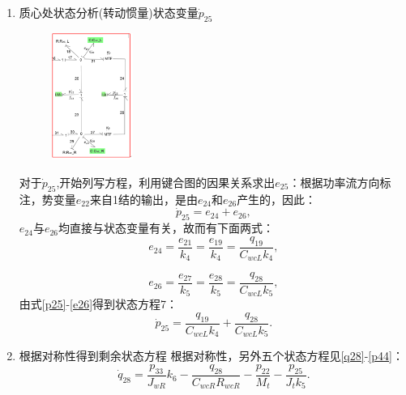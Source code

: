 \begin{enumerate}
\item {质心处状态分析(转动惯量)状态变量$\dot{ p}_{25} $}
\begin{figure}[H]
	\centering
	\includegraphics[width=0.25\textwidth]{fig/equation6.png}
	\caption{}\label{fig:equation6}
\end{figure}
对于$\dot{p} _ { 25 }$,开始列写方程，利用键合图的因果关系求出$e_{25}$：根据功率流方向标注，势变量$e_{22}$来自1结的输出，是由$e_{24}$和$e_{26}$产生的，因此：
\begin{equation}\label{p25}
\dot{ p } _ { 25 } = e _ { 24 } + e _ { 26 },
\end{equation}
$e_{24}$与$e_{26}$均直接与状态变量有关，故而有下面两式：
\begin{equation}
e _ { 24 } = \frac { e _ { 21 } } { k _ { 4 } } = \frac { e _ { 19 } } { k _ { 4 } } = \frac { q _ { 19 } } { C _ { w cL}  k _ { 4 } },
\end{equation}

\begin{equation}\label{e26}
e _ { 26 } = \frac { e _ { 27 } } { k _ { 5 } } = \frac { e _ { 28 } } { k _ { 5 } } = \frac { q _ { 28 } } { C _ { w c L }  k _ { 5 } },
\end{equation}
由式\ref{p25}-\ref{e26}得到状态方程7：
\begin{equation}
\dot{ p } _ { 25 } = \frac { q _ { 19 } } { C _ { w c L}  k _ { 4 } } + \frac { q _ { 28 } } { C _ { w cL }  k _ { 5 } }.
\end{equation}
\item {根据对称性得到剩余状态方程}
根据对称性，另外五个状态方程见\ref{q28}-\ref{p44}：
\begin{equation}\label{q28}
\dot{ q}  _ { 28 } = \frac { p _ { 33 } } { J _ { w R }  } k _ { 6 } - \frac { q _ { 28 } } { C _ { w cR }  R _ { w c R } } - \frac { p _ { 22 } } { M _ { t } } - \frac { p _ { 25 } } { J _ { t } k _ { 5 } }.
\end{equation}


\end{enumerate}
